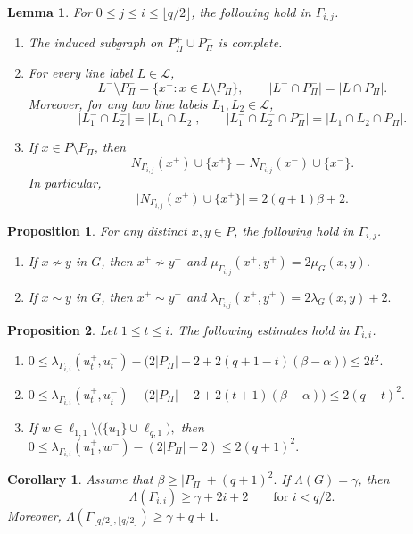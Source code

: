 \documentclass[10pt,a4paper]{amsart}
\newtheorem{lem}{Lemma}
\newtheorem{pro}{Proposition}
\newtheorem{cor}{Corollary}
\begin{document}
\begin{lem}\label{lem:basic-structure}
For $0\le j\le i\le \lfloor q/2\rfloor$, the following hold in $\Gamma_{i,j}$.
\begin{enumerate}[label=\textup{(\roman*)}]
\item The induced subgraph on $P_\Pi^+\cup P_\Pi^-$ is complete.
\item For every line label $L\in\mathcal L$,
\[
L^-\setminus P_\Pi^-=\{x^-:x\in L\setminus P_\Pi\},
\qquad
|L^-\cap P_\Pi^-|=|L\cap P_\Pi|.
\]
Moreover, for any two line labels $L_1,L_2\in\mathcal L$,
\[
|L_1^-\cap L_2^-|=|L_1\cap L_2|,
\qquad
|L_1^-\cap L_2^-\cap P_\Pi^-|=|L_1\cap L_2\cap P_\Pi|.
\]
\item If $x\in P\setminus P_\Pi$, then
\[
N_{\Gamma_{i,j}}(x^+)\cup\{x^+\}
=
N_{\Gamma_{i,j}}(x^-)\cup\{x^-\}.
\]
In particular,
\[
\bigl|N_{\Gamma_{i,j}}(x^+)\cup\{x^+\}\bigr|=2(q+1)\beta+2.
\]
\end{enumerate}
\end{lem}

\begin{pro}\label{prop:same-layer}
For any distinct \(x,y\in P\), the following hold in \(\Gamma_{i,j}\).
\begin{enumerate}[label=(\roman*)]
\item If $x\nsim y$ in $G$, then $x^+\nsim y^+$ and
$\mu_{\Gamma_{i,j}}(x^+,y^+)=2\mu_G(x,y).$
\item If $x\sim y$ in $G$, then $x^+\sim y^+$ and
$\lambda_{\Gamma_{i,j}}(x^+,y^+)=2\lambda_G(x,y)+2.$
\end{enumerate}
\end{pro}

\begin{pro}\label{prop:special-values}
Let $1\le t\le i$.
The following estimates hold in $\Gamma_{i,i}$.
\begin{enumerate}[label=\textup{(\roman*)}]
\item
$0\le
\lambda_{\Gamma_{i,i}}(u_t^+,u_t^-)
-
\bigl(2|P_\Pi|-2+2(q+1-t)(\beta-\alpha)\bigr)
\le 2t^2.$
\item
$0\le
\lambda_{\Gamma_{i,i}}(u_t^+,u_{\widetilde t}^-)
-
\bigl(2|P_\Pi|-2+2(t+1)(\beta-\alpha)\bigr)
\le 2(q-t)^2.$
\item If $w\in \ell_{1,1}\setminus\bigl(\{u_1\}\cup \ell_{q,1}\bigr),$
then
$
0\le
\lambda_{\Gamma_{i,i}}(u_1^+,w^-)-(2|P_\Pi|-2)
\le 2(q+1)^2.$
\end{enumerate}
\end{pro}

\begin{cor}\label{cor:tpl-level}
Assume that
$\beta\ge |P_\Pi|+(q+1)^2.$
If $\Lambda(G)=\gamma$, then
\[
\Lambda(\Gamma_{i,i})\ge \gamma+2i+2
\qquad\text{for } i<q/2.
\]
Moreover,
$\Lambda(\Gamma_{\lfloor q/2\rfloor,\lfloor q/2\rfloor})\ge \gamma+q+1.$
\end{cor}
\end{document}
